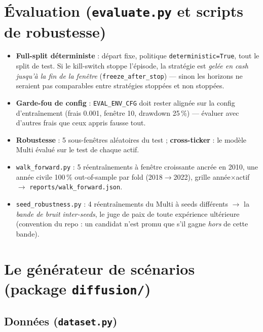 \documentclass[11pt,a4paper]{article}
\newcommand{\code}[1]{\texttt{#1}}
\begin{document}
\section{Évaluation (\code{evaluate.py} et scripts de robustesse)}

\begin{itemize}[itemsep=2pt]
  \item \textbf{Full-split déterministe} : départ fixe, politique
        \code{deterministic=True}, tout le split de test. Si le kill-switch
        stoppe l'épisode, la stratégie est \emph{gelée en cash jusqu'à la fin
        de la fenêtre} (\code{freeze\_after\_stop}) --- sinon les horizons ne
        seraient pas comparables entre stratégies stoppées et non stoppées.
  \item \textbf{Garde-fou de config} : \code{EVAL\_ENV\_CFG} doit rester
        alignée sur la config d'entraînement (frais 0.001, fenêtre 10,
        drawdown 25\,\%) --- évaluer avec d'autres frais que ceux appris
        fausse tout.
  \item \textbf{Robustesse} : 5 sous-fenêtres aléatoires du test ;
        \textbf{cross-ticker} : le modèle Multi évalué sur le test de chaque
        actif.
  \item \code{walk\_forward.py} : 5 réentraînements à fenêtre croissante
        ancrée en 2010, une année civile 100\,\% out-of-sample par fold
        (2018$\to$2022), grille année$\times$actif $\to$
        \code{reports/walk\_forward.json}.
  \item \code{seed\_robustness.py} : 4 réentraînements du Multi à seeds
        différents $\to$ la \emph{bande de bruit inter-seeds}, le juge de paix
        de toute expérience ultérieure (convention du repo : un candidat n'est
        promu que s'il gagne \emph{hors} de cette bande).
\end{itemize}

\section{Le générateur de scénarios (package \code{diffusion/})}

\subsection{Données (\code{dataset.py})}
\end{document}
